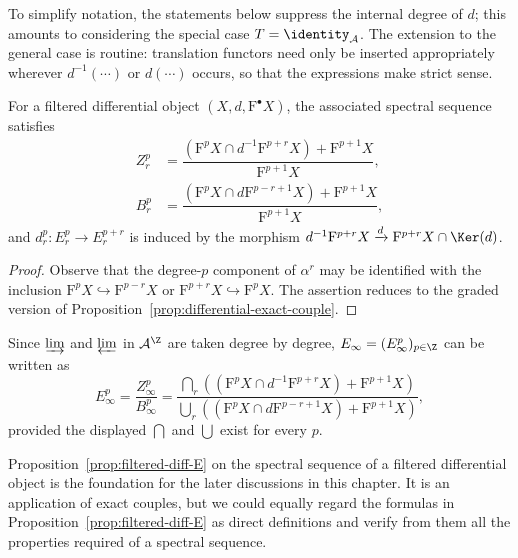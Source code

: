 To simplify notation, the statements below suppress the internal degree of
$d$; this amounts to considering the special case
$T=\identity_{\mathcal{A}}$. The extension to the general case is routine:
translation functors need only be inserted appropriately wherever
$d^{-1}(\cdots)$ or $d(\cdots)$ occurs, so that the expressions make strict
sense.

\begin{proposition}\label{prop:filtered-diff-E}
	For a filtered differential object $(X,d,\mathrm{F}^\bullet X)$, the
	associated spectral sequence satisfies
	\begin{align*}
		Z_r^p&=\dfrac{\left(\mathrm{F}^pX\cap d^{-1}\mathrm{F}^{p+r}X\right)
		+\mathrm{F}^{p+1}X}{\mathrm{F}^{p+1}X}, \\
		B_r^p&=\dfrac{\left(\mathrm{F}^pX\cap d\mathrm{F}^{p-r+1}X\right)
		+\mathrm{F}^{p+1}X}{\mathrm{F}^{p+1}X},
	\end{align*}
	and $d_r^p:E_r^p\to E_r^{p+r}$ is induced by the morphism
	$d^{-1}\mathrm{F}^{p+r}X\xrightarrow{d}
	\mathrm{F}^{p+r}X\cap\Ker(d)$.
\end{proposition}
\begin{proof}
	Observe that the degree-$p$ component of $\alpha^r$ may be identified with
	the inclusion $\mathrm{F}^pX\hookrightarrow\mathrm{F}^{p-r}X$ or
	$\mathrm{F}^{p+r}X\hookrightarrow\mathrm{F}^pX$. The assertion reduces to
	the graded version of Proposition~\ref{prop:differential-exact-couple}.
\end{proof}

Since $\varinjlim$ and $\varprojlim$ in $\mathcal{A}^{\Z}$ are taken degree
by degree, $E_\infty=(E_\infty^p)_{p\in\Z}$ can be written as
\begin{equation}\label{eqn:filtered-diff-infty}
	E_\infty^p=\dfrac{Z_\infty^p}{B_\infty^p}
	=\dfrac{\bigcap_r\left((\mathrm{F}^pX\cap d^{-1}\mathrm{F}^{p+r}X)
	+\mathrm{F}^{p+1}X\right)}
	{\bigcup_r\left((\mathrm{F}^pX\cap d\mathrm{F}^{p-r+1}X)
	+\mathrm{F}^{p+1}X\right)},
\end{equation}
provided the displayed $\bigcap$ and $\bigcup$ exist for every $p$.

\begin{remark}
	Proposition~\ref{prop:filtered-diff-E} on the spectral sequence of a filtered
	differential object is the foundation for the later discussions in this
	chapter. It is an application of exact couples, but we could equally regard
	the formulas in Proposition~\ref{prop:filtered-diff-E} as direct definitions
	and verify from them all the properties required of a spectral sequence.
\end{remark}

